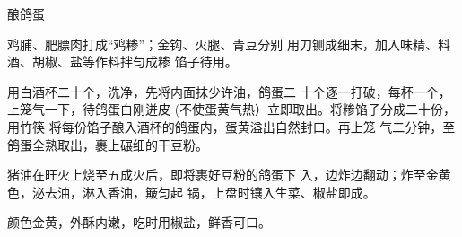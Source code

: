 \begin{recipe}{酿鸽蛋}

\ingredients


\cooking

\step 鸡脯、肥膘肉打成“鸡糁”；金钩、火腿、青豆分别 用刀铡成细末，加入味精、料酒、胡椒、盐等作料拌匀成糁 馅子待用。

用白酒杯二十个，洗净，先将内面抹少许油，鸽蛋二 十个逐一打破，每杯一个，上笼气一下，待鸽蛋白刚迸皮 (不使蛋黄气热）立即取出。将糁馅子分成二十份，用竹筷 将每份馅子酿入酒杯的鸽蛋内，蛋黄溢出自然封口。再上笼 气二分钟，至鸽蛋全熟取出，裹上碾细的干豆粉。

\step 猪油在旺火上烧至五成火后，即将裹好豆粉的鸽蛋下 入，边炸边翻动；炸至金黄色，泌去油，淋入香油，簸匀起 锅，上盘时镶入生菜、椒盐即成。

\notes

颜色金黄，外酥内嫩，吃时用椒盐，鲜香可口。

\end{recipe}


